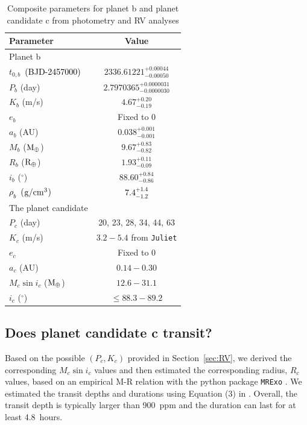 \documentclass[twocolumn]{aastex631}
\newcommand{\rev}[1]{\textcolor{black}{#1}}
\newcommand{\code}[1]{{\texttt{#1}}}
\begin{document}
\begin{table}[h]
 	\centering
 	\caption{Composite parameters for planet b and planet candidate c from photometry and RV analyses}
 	\label{tab:planet-pars}
 	\begin{tabular}{lc} %
 		\hline
 		\hline
 		Parameter & Value\\
 		\hline
 		Planet b & \\
 		$t_{0,b}$~\rev{(BJD-2457000)} & $2336.61221^{+0.00044}_{-0.00050}$ \\
 		$P_b$ (day) & $2.7970365^{+0.0000031}_{-0.0000030}$ \\
 		$K_b$ (m/s) & $4.67^{+0.20}_{-0.19}$ \\
 		$e_b$ & Fixed to 0 \\
 		$a_b$ (AU) & $0.038^{+0.001}_{-0.001}$ \\
 		$M_b$ ($\rm{M_{\oplus}}$) & $9.67^{+0.83}_{-0.82}$ \\
 		$R_b$ ($\rm{R_{\oplus}}$) & $1.93^{+0.11}_{-0.09}$ \\
 		$i_b$ ($^{\circ}$) & $88.60^{+0.84}_{-0.86}$ \\
        \rev{$\rho_b$~($\rm{g/cm^3}$)} & \rev{$7.4^{+1.4}_{-1.2}$} \\
 		\hline
 		The planet candidate & \\
 		$P_c$ (day) & 20, 23, 28, 34, 44, 63 \\
 		$K_c$ (m/s) & $3.2-5.4$ from \code{Juliet} \\
 		$e_c$ & Fixed to 0 \\
 		$a_c$ (AU) & $0.14-0.30$ \\
 		$M_c\sin{i_c}$ ($\rm{M_{\oplus}}$) & $12.6-31.1$ \\
 		$i_c$ ($^{\circ}$) & $\leqslant 88.3-89.2$ \\
 		\hline
 	\end{tabular}
\end{table}


\subsection{Does planet candidate c transit?}
\label{sec:bls}

Based on the possible $(P_c, K_c)$ provided in Section~\ref{sec:RV}, we derived the corresponding $M_c\sin{i_c}$ values and then estimated the corresponding radius, $R_c$ values, based on an empirical M-R relation with the python package \code{MRExo} \citep{lia_corrales_2015_15991}. We estimated the transit depths and durations using Equation (3) in \cite{Seager2002}. Overall, the transit depth is typically larger than 900~ppm and the duration can last for at least 4.8~hours.
\end{document}

